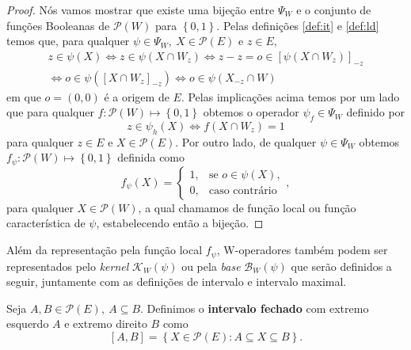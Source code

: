 \begin{proof}
    Nós vamos mostrar que existe uma bijeção entre $\Psi_{W}$ e o conjunto de funções Booleanas de $\mathcal{P} \left( W \right)$ para $\left\{ 0,1 \right\}$. Pelas definições \ref{def:it} e \ref{def:ld} temos que, para qualquer $\psi \in \Psi_{W}, \ X \in \mathcal{P} \left( E \right) $ e $z \in E$,
    \begin{equation*}
        \begin{split}
            z \in \psi \left( X \right) \iff	z \in \psi \left( X \cap W_{z} \right) \iff z-z = o \in \left[ \psi \left( X \cap W_{z} \right) \right]_{-z} \\ \iff o \in \psi \left( \left[ X \cap W_{z} \right]_{-z} \right) \iff o \in \psi \left( X_{-z} \cap W \right)
        \end{split}
    \end{equation*}
    em que $o=\left( 0,0 \right)$ é a origem de $E$. Pelas implicações acima temos por um lado que para qualquer $f: \mathcal{P} \left( W \right) \mapsto \left\{ 0,1 \right\} $ obtemos o operador $\psi_{f} \in \Psi_{W}$ definido por
    $$z \in \psi_{h} \left( X \right) \iff f \left( X \cap W_{z} \right) = 1$$
    para qualquer $z \in E$ e $X \in \mathcal{P} \left( E \right)$. Por outro lado, de qualquer $\psi \in \Psi_{W}$ obtemos $f_{\psi} : \mathcal{P}(W) \mapsto \left\{ 0,1 \right\}$ definida como 
    \begin{equation*}
        f_{\psi} \left( X \right) = \begin{cases}
        1, & \text{se $o \in \psi \left( X \right)$},\\
        0, & \text{caso contrário}
        \end{cases},
   \end{equation*}
    para qualquer $X \in \mathcal{P} \left( W \right)$, a qual chamamos de função local ou função característica de $\psi$, estabelecendo então a bijeção. 
\end{proof} 

Além da representação pela função local $f_{\psi}$, W-operadores também podem ser representados pelo \textit{kernel} $\mathcal{K}_{W} \left( \psi \right) $ ou pela \textit{base} $\mathcal{B}_{W} \left( \psi \right) $ que serão definidos a seguir, juntamente com as definições de intervalo e intervalo maximal.

\begin{definition} 
        Seja $A, B \in \mathcal{P}\left(E\right), \ A \subseteq B $. Definimos o \textbf{intervalo fechado} com extremo esquerdo $A$ e extremo direito $B$ como       
        $$ \left[ A,B \right] = \left\{ X \in \mathcal{P}\left(E\right): A \subseteq X \subseteq B \right\}. $$        
\end{definition}

